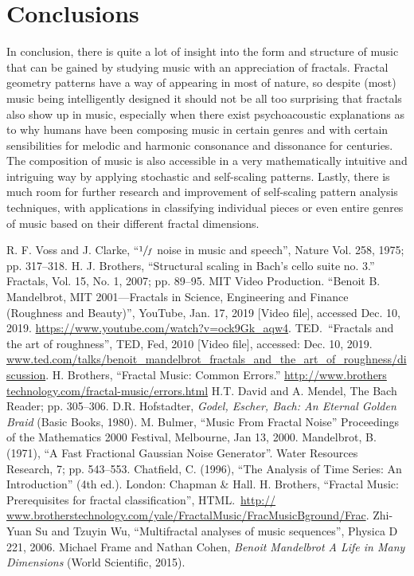 \documentclass{article}
\begin{document}
\section{Conclusions}

In conclusion, there is quite a lot of insight into the form and structure of
music that can be gained by studying music with an appreciation of fractals.
Fractal geometry patterns have a way of appearing in most of nature, so despite
(most) music being intelligently designed it should not be all too surprising
that fractals also show up in music, especially when there exist psychoacoustic
explanations as to why humans have been composing music in certain genres and
with certain sensibilities for melodic and harmonic consonance and dissonance
for centuries.
The composition of music is also accessible in a very mathematically intuitive
and intriguing way by applying stochastic and self-scaling patterns.
Lastly, there is much room for further research and improvement of self-scaling
pattern analysis techniques, with applications in classifying individual pieces
or even entire genres of music based on their different fractal dimensions.

\begin{thebibliography}{9}
    R. F. Voss and J. Clarke,
    ``$\sfrac 1 f$ noise in music and speech'',
    Nature Vol. 258, 1975; pp. 317--318.
    H. J. Brothers,
    ``Structural scaling in Bach's cello suite no. 3.''
    Fractals, Vol. 15, No. 1, 2007; pp. 89--95.
    MIT Video Production.
    ``Benoit B. Mandelbrot, MIT 2001---Fractals in Science, Engineering and Finance (Roughness and Beauty)'',
        YouTube, Jan. 17, 2019 [Video file],
    accessed Dec. 10, 2019.
    \url{https://www.youtube.com/watch?v=ock9Gk_aqw4}.
    TED.\
    ``Fractals and the art of roughness'',
    TED, Fed, 2010 [Video file],
    accessed: Dec. 10, 2019.
    \url{www.ted.com/talks/benoit_mandelbrot_fractals_and_the_art_of_roughness/discussion}.
\bibitem{5}
    H. Brothers,
    ``Fractal Music: Common Errors.''
    \url{http://www.brothers technology.com/fractal-music/errors.html}
\bibitem{6}
    H.T. David and A. Mendel,
    The Bach Reader; pp. 305--306.
    D.R. Hofstadter,
    \emph{Godel, Escher, Bach: An Eternal Golden Braid} (Basic Books, 1980).
\bibitem{8}
    M. Bulmer,
    ``Music From Fractal Noise''
    Proceedings of the Mathematics 2000 Festival, Melbourne, Jan 13, 2000.
\bibitem{9}
    Mandelbrot, B. (1971),
    ``A Fast Fractional Gaussian Noise Generator''.
    Water Resources Research, 7; pp. 543–553.
    Chatfield, C. (1996),
    ``The Analysis of Time Series: An Introduction'' (4th ed.).
    London: Chapman \& Hall.
    H. Brothers,
    ``Fractal Music: Prerequisites for fractal classification'', HTML.\
    \url{http:// www.brotherstechnology.com/yale/FractalMusic/FracMusicBground/Frac}.
\bibitem{12}
    Zhi-Yuan Su and Tzuyin Wu,
    ``Multifractal analyses of music sequences'',
    Physica D 221, 2006.
\bibitem{13}
    Michael Frame and Nathan Cohen,
    \emph{Benoit Mandelbrot A Life in Many Dimensions} (World Scientific, 2015).
\end{thebibliography}
\end{document}

